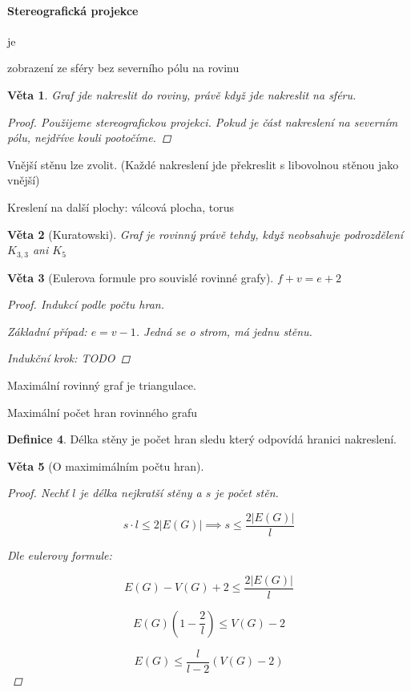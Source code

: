 \documentclass[10pt,a4paper]{article}
\theoremstyle{plain}
\newtheorem{veta}{Věta}
\theoremstyle{definition}
\newtheorem{definice}[veta]{Definice}
\begin{document}
\paragraph{Stereografická projekce} je

zobrazení ze sféry bez severního pólu na rovinu

\begin{veta}
Graf jde nakreslit do roviny, právě když jde nakreslit na sféru.
\begin{proof}
Použijeme stereografickou projekci. Pokud je část nakreslení na severním pólu, nejdříve kouli pootočíme.
\end{proof}
\end{veta}

Vnější stěnu lze zvolit. (Každé nakreslení jde překreslit s libovolnou stěnou jako vnější)

Kreslení na další plochy: válcová plocha, torus

\begin{veta}[Kuratowski]
Graf je rovinný právě tehdy, když neobsahuje podrozdělení $K_{3,3}$ ani $K_5$
\end{veta}

\begin{veta}[Eulerova formule pro souvislé rovinné grafy]
$f + v= e + 2$
\begin{proof}
Indukcí podle počtu hran.

Základní případ: $e = v - 1$. Jedná se o strom, má jednu stěnu.

Indukční krok: TODO
\end{proof}
\end{veta}
 

Maximální rovinný graf je triangulace.


Maximální počet hran rovinného grafu

\begin{definice}
Délka stěny je počet hran sledu který odpovídá hranici nakreslení. 
\end{definice}

\begin{veta}[O maximimálním počtu hran]
\begin{proof}
Nechť $l$ je délka nejkratší stěny a $s$ je počet stěn.

\[ s \cdot l \leq 2|E(G)|  \implies s \leq \frac{2|E(G)| }l\]

Dle eulerovy formule:

\[ E(G) - V(G) + 2 \leq \frac{2|E(G)| }l\]

\[ E(G)\left(1-\frac{2}l \right) \leq  V(G) - 2 \]

\[ E(G) \leq  \frac{l}{l-2}  (V(G) - 2) \]

\end{proof}

\end{veta}
\end{document}
